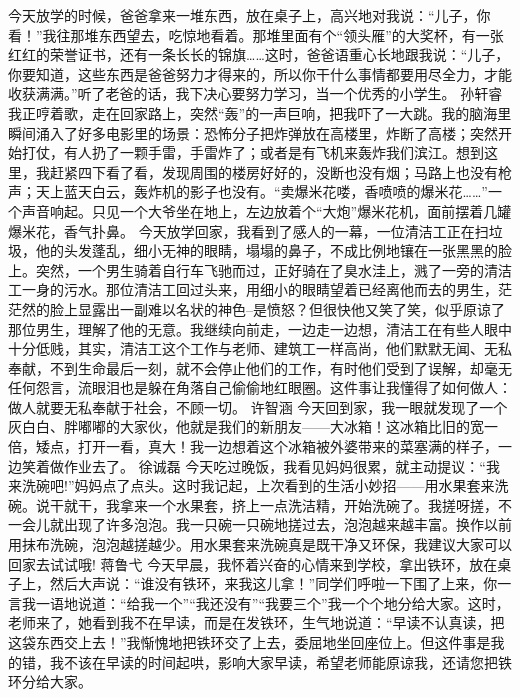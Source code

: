 {}今天放学的时候，爸爸拿来一堆东西，放在桌子上，高兴地对我说：“儿子，你看！”我往那堆东西望去，吃惊地看着。那堆里面有个“领头雁”的大奖杯，有一张红红的荣誉证书，还有一条长长的锦旗……这时，爸爸语重心长地跟我说：“儿子，你要知道，这些东西是爸爸努力才得来的，所以你干什么事情都要用尽全力，才能收获满满。”听了老爸的话，我下决心要努力学习，当一个优秀的小学生。\markdownRendererInterblockSeparator
{}\markdownRendererInterblockSeparator
{}孙轩睿\markdownRendererInterblockSeparator
{}我正哼着歌，走在回家路上，突然“轰”的一声巨响，把我吓了一大跳。我的脑海里瞬间涌入了好多电影里的场景：恐怖分子把炸弹放在高楼里，炸断了高楼；突然开始打仗，有人扔了一颗手雷，手雷炸了；或者是有飞机来轰炸我们滨江。想到这里，我赶紧四下看了看，发现周围的楼房好好的，没断也没有烟；马路上也没有枪声；天上蓝天白云，轰炸机的影子也没有。“卖爆米花喽，香喷喷的爆米花……”一个声音响起。只见一个大爷坐在地上，左边放着个“大炮”爆米花机，面前摆着几罐爆米花，香气扑鼻。\markdownRendererInterblockSeparator
{}\markdownRendererInterblockSeparator
{}今天放学回家，我看到了感人的一幕，一位清洁工正在扫垃圾，他的头发蓬乱，细小无神的眼睛，塌塌的鼻子，不成比例地镶在一张黑黑的脸上。突然，一个男生骑着自行车飞驰而过，正好骑在了臭水洼上，溅了一旁的清洁工一身的污水。那位清洁工回过头来，用细小的眼睛望着已经离他而去的男生，茫茫然的脸上显露出一副难以名状的神色--是愤怒？但很快他又笑了笑，似乎原谅了那位男生，理解了他的无意。我继续向前走，一边走一边想，清洁工在有些人眼中十分低贱，其实，清洁工这个工作与老师、建筑工一样高尚，他们默默无闻、无私奉献，不到生命最后一刻，就不会停止他们的工作，有时他们受到了误解，却毫无任何怨言，流眼泪也是躲在角落自己偷偷地红眼圈。这件事让我懂得了如何做人：做人就要无私奉献于社会，不顾一切。\markdownRendererInterblockSeparator
{}\markdownRendererInterblockSeparator
{}许智涵\markdownRendererInterblockSeparator
{}今天回到家，我一眼就发现了一个灰白白、胖嘟嘟的大家伙，他就是我们的新朋友——大冰箱！这冰箱比旧的宽一倍，矮点，打开一看，真大！我一边想着这个冰箱被外婆带来的菜塞满的样子，一边笑着做作业去了。\markdownRendererInterblockSeparator
{}\markdownRendererInterblockSeparator
{}徐诚磊\markdownRendererInterblockSeparator
{}今天吃过晚饭，我看见妈妈很累，就主动提议：“我来洗碗吧!”妈妈点了点头。这时我记起，上次看到的生活小妙招——用水果套来洗碗。说干就干，我拿来一个水果套，挤上一点洗洁精，开始洗碗了。我搓呀搓，不一会儿就出现了许多泡泡。我一只碗一只碗地搓过去，泡泡越来越丰富。换作以前用抹布洗碗，泡泡越搓越少。用水果套来洗碗真是既干净又环保，我建议大家可以回家去试试哦!\markdownRendererInterblockSeparator
{}\markdownRendererInterblockSeparator
{}蒋鲁弋\markdownRendererInterblockSeparator
{}今天早晨，我怀着兴奋的心情来到学校，拿出铁环，放在桌子上，然后大声说：“谁没有铁环，来我这儿拿！”同学们呼啦一下围了上来，你一言我一语地说道：“给我一个”“我还没有”“我要三个”\markdownRendererEllipsis{}\markdownRendererEllipsis{}我一个个地分给大家。这时，老师来了，她看到我不在早读，而是在发铁环，生气地说道：“早读不认真读，把这袋东西交上去！”我惭愧地把铁环交了上去，委屈地坐回座位上。但这件事是我的错，我不该在早读的时间起哄，影响大家早读，希望老师能原谅我，还请您把铁环分给大家。\markdownRendererDocumentEnd